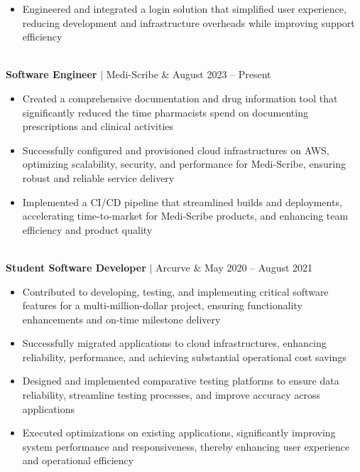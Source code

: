 \documentclass[11pt]{article}
\newenvironment{compactList}
{
  \begin{itemize}
    \setlength{\itemsep}{0pt}
    \setlength{\parskip}{0pt}
}
{\end{itemize}}
\begin{document}
\begin{tabularx}{\textwidth\setlength{\extrarowheight}{5pt}}
{\begin{minipage}{0.85\paperwidth}
\begin{compactList}
        \item Engineered and integrated a login solution that simplified user experience, reducing development and infrastructure overheads while improving support efficiency
      \end{compactList}
    \end{minipage}
  }
  \\
  \textbf{Software Engineer} $\vert$ Medi-Scribe               & August 2023 – Present \\
  {
    \begin{minipage}{0.85\paperwidth}
      \begin{compactList}
        \item Created a comprehensive documentation and drug information tool that significantly reduced the time pharmacists spend on documenting prescriptions and clinical activities
        \item Successfully configured and provisioned cloud infrastructures on AWS, optimizing scalability, security, and performance for Medi-Scribe, ensuring robust and reliable service delivery
        \item Implemented a CI/CD pipeline that streamlined builds and deployments, accelerating time-to-market for Medi-Scribe products, and enhancing team efficiency and product quality
      \end{compactList}
    \end{minipage}
  }
  \\
  \textbf{Student Software Developer} $\vert$ Arcurve                     & May 2020 – August 2021 \\
  {
    \begin{minipage}{0.85\paperwidth}
      \begin{compactList}
        \item Contributed to developing, testing, and implementing critical software features for a multi-million-dollar project, ensuring functionality enhancements and on-time milestone delivery
        \item Successfully migrated applications to cloud infrastructures, enhancing reliability, performance, and achieving substantial operational cost savings
        \item Designed and implemented comparative testing platforms to ensure data reliability, streamline testing processes, and improve accuracy across applications
        \item Executed optimizations on existing applications, significantly improving system performance and responsiveness, thereby enhancing user experience and operational efficiency
      \end{compactList}
    \end{minipage}
  }
\end{tabularx}
\vspace{-10pt}
\end{document}
